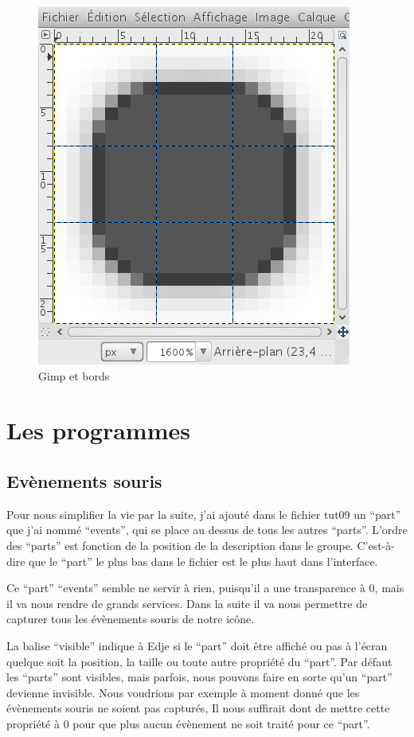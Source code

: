 \documentclass[a4paper]{efr}
\begin{document}
\begin{figure}
  \begin{center}
    \includegraphics[scale=0.5]{images/border2.png}
  \end{center}
  \caption{Gimp et bords}
\end{figure}



\section{Les programmes}

\subsection{Evènements souris}

Pour nous simplifier la vie par la suite, j'ai ajouté dans le fichier tut09
un ``part'' que j'ai nommé ``events'', qui se place au dessus de tous les autres
``parts''. L'ordre des ``parts'' est fonction de la position de la description dans le
groupe. C'est-à-dire que le ``part'' le plus bas dans le fichier est le plus haut
dans l'interface.

Ce ``part'' ``events'' semble ne servir à rien, puisqu'il a une transparence à 0,
mais il va nous rendre de grands services. Dans la suite il va nous permettre de
capturer tous les évènements souris de notre icône.

La balise ``visible'' indique à Edje si le ``part'' doit être affiché ou pas à l'écran
quelque soit la position, la taille ou toute autre propriété du ``part''.
Par défaut les ``parts'' sont visibles, mais parfois, nous pouvons faire en sorte
qu'un ``part'' devienne invisible. Nous voudrions par exemple à moment donné que
les évènements souris ne soient pas capturés, Il nous suffirait dont de mettre
cette propriété à 0 pour que plus aucun évènement ne soit traité pour ce
``part''.
\end{document}
